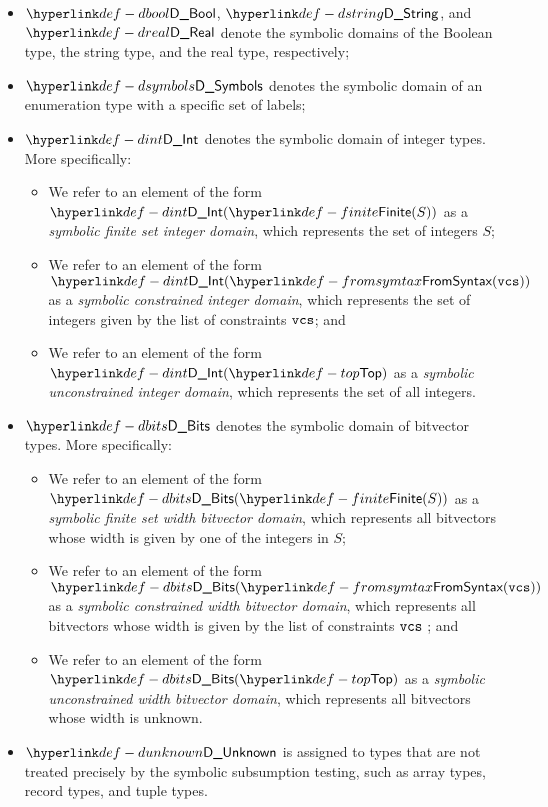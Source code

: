 \begin{itemize}
  \item $\DBool$, $\DString$, and $\DReal$ denote the symbolic domains of the Boolean type, the string type,
        and the real type, respectively;
  \item $\DSymbols$ denotes the symbolic domain of an enumeration type with a specific set of labels;
  \item $\DInt$ denotes the symbolic domain of integer types.
        More specifically:
        \begin{itemize}
          \item We refer to an element of the form $\DInt(\Finite(S))$ as a \emph{symbolic finite set integer domain},
                which represents the set of integers $S$;
          \item We refer to an element of the form $\DInt(\FromSyntax(\vcs))$ as a \emph{symbolic constrained integer domain},
                which represents the set of integers given by the list of constraints $\texttt{vcs}$; and
          \item We refer to an element of the form $\DInt(\Top)$ as a \emph{symbolic unconstrained integer domain},
                which represents the set of all integers.
        \end{itemize}
  \item $\DBits$ denotes the symbolic domain of bitvector types.
        More specifically:
        \begin{itemize}
        \item We refer to an element of the form $\DBits(\Finite(S))$ as a \emph{symbolic finite set width bitvector domain},
              which represents all bitvectors whose width is given by one of the integers in $S$;
        \item We refer to an element of the form $\DBits(\FromSyntax(\vcs))$ as a
              \emph{symbolic constrained width bitvector domain}, which represents all bitvectors whose width
              is given by the list of constraints $\texttt{vcs}$ ; and
        \item We refer to an element of the form $\DBits(\Top)$ as a \emph{symbolic unconstrained width bitvector domain},
              which represents all bitvectors whose width is unknown.
        \end{itemize}
  \item $\DUnknown$ is assigned to types that are not treated precisely by the symbolic subsumption testing,
        such as array types, record types, and tuple types.
\end{itemize}

